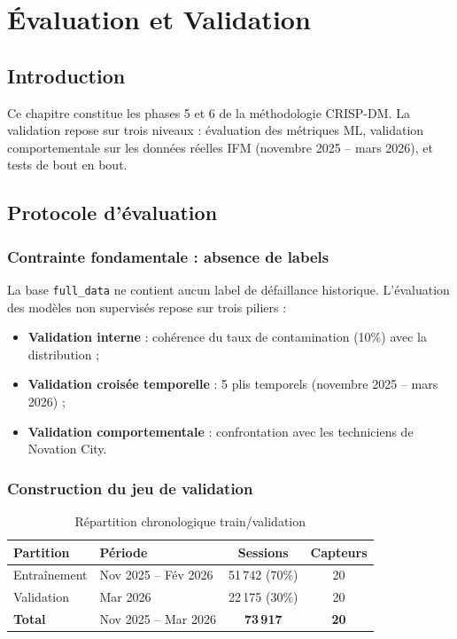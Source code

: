 \documentclass[12pt,a4paper]{report}
\begin{document}
\chapter{Évaluation et Validation}

\section*{Introduction}

Ce chapitre constitue les phases 5 et 6 de la méthodologie CRISP-DM. La validation
repose sur trois niveaux : évaluation des métriques ML, validation comportementale sur
les données réelles IFM (novembre 2025 -- mars 2026), et tests de bout en bout.

\section{Protocole d'évaluation}

\subsection{Contrainte fondamentale : absence de labels}

La base \texttt{full\_data} ne contient aucun label de défaillance historique. L'évaluation
des modèles non supervisés repose sur trois piliers :
\begin{itemize}
  \item \textbf{Validation interne} : cohérence du taux de contamination (10\%) avec la distribution ;
  \item \textbf{Validation croisée temporelle} : 5 plis temporels (novembre 2025 -- mars 2026) ;
  \item \textbf{Validation comportementale} : confrontation avec les techniciens de Novation City.
\end{itemize}

\subsection{Construction du jeu de validation}

\begin{table}[h]
\centering
\caption{Répartition chronologique train/validation}
\begin{tabular}{llcc}
\toprule
\textbf{Partition} & \textbf{Période} & \textbf{Sessions} & \textbf{Capteurs} \\
\midrule
Entraînement & Nov 2025 -- Fév 2026 & 51\,742 (70\%) & 20 \\
Validation   & Mar 2026             & 22\,175 (30\%) & 20 \\
\textbf{Total} & Nov 2025 -- Mar 2026 & \textbf{73\,917} & \textbf{20} \\
\bottomrule
\end{tabular}
\end{table}
\end{document}
